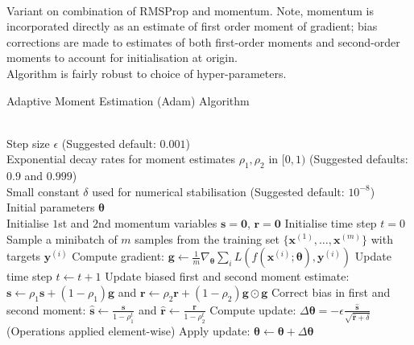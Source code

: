 \begin{remark} \\
Variant on combination of RMSProp and momentum. Note, momentum is incorporated directly as an estimate of first order moment of gradient; bias corrections are made to estimates of both first-order moments and second-order moments to account for initialisation at origin.\\
Algorithm is fairly robust to choice of hyper-parameters.
\end{remark}

\begin{breakablealgorithm}
\caption{Adaptive Moment Estimation (Adam) Algorithm}
\begin{algorithmic}
\Require \\
Step size $\epsilon$ (Suggested default: $0.001$)\\
Exponential decay rates for moment estimates $\rho_1, \rho_2$ in $[0,1)$ (Suggested defaults: $0.9$ and $0.999$)\\
Small constant $\delta$ used for numerical stabilisation (Suggested default: $10^{-8}$)\\
Initial parameters $\bm{\theta}$\\

\State Initialise $1$st and $2$nd momentum variables $\bm{s} = \bm{0}$, $\bm{r} = \bm{0}$
\State Initialise time step $t=0$
\State Sample a minibatch of $m$ samples from the training set $\{\bm{x}^{(1)}, \ldots, \bm{x}^{(m)} \}$ with targets $\bm{y}^{(i)}$
\State Compute gradient: $\bm{g} \leftarrow \frac{1}{m} \nabla_{\bm{\theta}} \sum_i L(f(\bm{x}^{(i)}; \bm{\theta}), \bm{y}^{(i)})$
\State Update time step $t \leftarrow t+1$
\State Update biased first and second moment estimate: $\bm{s} \leftarrow \rho_1 \bm{s} + (1-\rho_1) \bm{g}$ and $\bm{r} \leftarrow \rho_2 \bm{r} + (1-\rho_2) \bm{g} \odot \bm{g}$
\State Correct bias in first and second moment: $\hat{\bm{s}} \leftarrow \frac{\bm{s}}{1 - \rho_1^t}$ and $\hat{\bm{r}} \leftarrow \frac{\bm{r}}{1 - \rho_2^t}$
\State Compute update: $\Delta \bm{\theta} = - \epsilon \frac{\hat{\bm{s}}}{\sqrt{\hat{\bm{r}} + \delta}}$ (Operations applied element-wise)
\State Apply update: $\bm{\theta} \leftarrow \bm{\theta} + \Delta \bm{\theta}$
\EndWhile
\end{algorithmic}
\end{breakablealgorithm}

